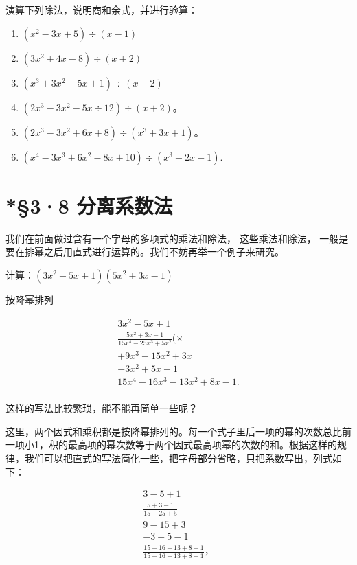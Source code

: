 演算下列除法，说明商和余式，并进行验算：

\begin{enumerate}[start=1]
\item
  \((x^{2} - 3x + 5)\div (x - 1)\)
\item
  \((3x^{2} + 4x - 8)\div (x + 2)\)
\item
  \((x^{3} + 3x^{2} - 5x + 1)\div (x - 2)\)
\item
  \((2x^{3} - 3x^{2} - 5x \div 12) \div (x + 2)\)。
\item
  \((2x^{3} - 3x^{2} + 6x + 8) \div (x^{3} + 3x + 1)\)。
\item
  \((x^{4} - 3x^{3} + 6x^{2} - 8x + 10)\div (x^{3} - 2x - 1).\)
\end{enumerate}

\section{*§3·8 分离系数法}

我们在前面做过含有一个字母的多项式的乘法和除法， 这些乘法和除法，
一般是要在排幂之后用直式进行运算的。我们不妨再举一个例子来研究。

 计算：\((3x^{2} - 5x + 1)(5x^{2} + 3x - 1)\)

 按降幂排列

\[
\begin{array}{l} 3 x ^{2} - 5 x + 1 \\ \frac{5 x ^{2} + 3 x - 1}{15 x ^{4} - 25 x ^{3} + 5 x ^{2}} (\times \\ + 9 x ^{3} - 15 x ^{2} + 3 x \\ - 3 x ^{2} + 5 x - 1 \\ 15 x ^{4} - 16 x ^{3} - 13 x ^{2} + 8 x - 1. \\ \end{array}
\]

这样的写法比较繁琐，能不能再简单一些呢？

这里，两个因式和乘积都是按降幂排列的。每一个式子里后一项的幂的次数总比前一项小1，积的最高项的幂次数等于两个因式最高项幂的次数的和。根据这样的规律，我们可以把直式的写法简化一些，把字母部分省略，只把系数写出，列式如下：

\[
\begin{array}{l} 3 - 5 + 1 \\ \frac{5 + 3 - 1}{15 - 25 + 5} \\ 9 - 15 + 3 \\ - 3 + 5 - 1 \\ \frac{15 - 16 - 13 + 8 - 1}{15 - 16 - 13 + 8 - 1}\text{，} \\ \end{array}
\]

